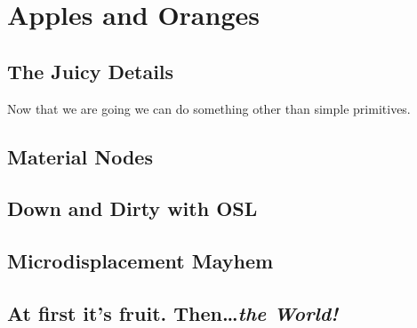 \chapter{Apples and Oranges}
\section{The Juicy Details}
Now that we are going we can do something other than simple primitives.
\section{Material Nodes}
\section{Down and Dirty with OSL}
\section{Microdisplacement Mayhem}
\section{At first it's fruit.  Then\ldots \emph{the World!}}
